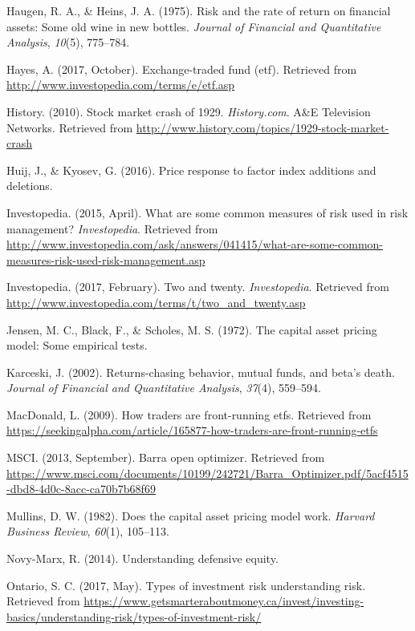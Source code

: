 \documentclass[12pt,twoside]{reedthesis}
\theoremstyle{definition}
\theoremstyle{definition}
\theoremstyle{definition}
\theoremstyle{remark}
\begin{document}
\hypertarget{ref-haugen1975}{}
Haugen, R. A., \& Heins, J. A. (1975). Risk and the rate of return on
financial assets: Some old wine in new bottles. \emph{Journal of
Financial and Quantitative Analysis}, \emph{10}(5), 775--784.

\hypertarget{ref-hayes2017}{}
Hayes, A. (2017, October). Exchange-traded fund (etf). Retrieved from
\url{http://www.investopedia.com/terms/e/etf.asp}

\hypertarget{ref-history2010}{}
History. (2010). Stock market crash of 1929. \emph{History.com}. A\&E
Television Networks. Retrieved from
\url{http://www.history.com/topics/1929-stock-market-crash}

\hypertarget{ref-huij2016}{}
Huij, J., \& Kyosev, G. (2016). Price response to factor index additions
and deletions.

\hypertarget{ref-investopedia2015}{}
Investopedia. (2015, April). What are some common measures of risk used
in risk management? \emph{Investopedia}. Retrieved from
\url{http://www.investopedia.com/ask/answers/041415/what-are-some-common-measures-risk-used-risk-management.asp}

\hypertarget{ref-investopedia2017}{}
Investopedia. (2017, February). Two and twenty. \emph{Investopedia}.
Retrieved from
\url{http://www.investopedia.com/terms/t/two_and_twenty.asp}

\hypertarget{ref-jensen1972}{}
Jensen, M. C., Black, F., \& Scholes, M. S. (1972). The capital asset
pricing model: Some empirical tests.

\hypertarget{ref-karceski2002}{}
Karceski, J. (2002). Returns-chasing behavior, mutual funds, and beta's
death. \emph{Journal of Financial and Quantitative Analysis},
\emph{37}(4), 559--594.

\hypertarget{ref-macdonald2009}{}
MacDonald, L. (2009). How traders are front-running etfs. Retrieved from
\url{https://seekingalpha.com/article/165877-how-traders-are-front-running-etfs}

\hypertarget{ref-msci2013}{}
MSCI. (2013, September). Barra open optimizer. Retrieved from
\url{https://www.msci.com/documents/10199/242721/Barra_Optimizer.pdf/5acf4515-dbd8-4d0c-8acc-ca70b7b68f69}

\hypertarget{ref-mullins1982}{}
Mullins, D. W. (1982). Does the capital asset pricing model work.
\emph{Harvard Business Review}, \emph{60}(1), 105--113.

\hypertarget{ref-novy2014}{}
Novy-Marx, R. (2014). Understanding defensive equity.

\hypertarget{ref-ontario2017}{}
Ontario, S. C. (2017, May). Types of investment risk \textbar{}
understanding risk. Retrieved from
\url{https://www.getsmarteraboutmoney.ca/invest/investing-basics/understanding-risk/types-of-investment-risk/}
\end{document}
